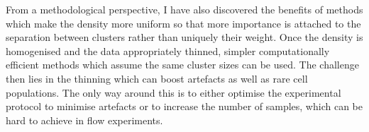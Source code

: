 From a methodological perspective, I have also discovered the benefits of methods which make the density more uniform so that more importance is attached to the separation between clusters rather than uniquely their weight.
Once the density is homogenised and the data appropriately thinned, simpler computationally efficient methods which assume the same cluster sizes can be used.
The challenge then lies in the thinning which can boost artefacts as well as rare cell populations.
The only way around this is to either optimise the experimental protocol to minimise artefacts or to increase the number of samples, which can be hard to achieve in flow experiments. %

